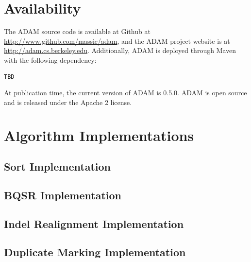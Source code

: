 \documentclass[10pt,twocolumn]{article}
\theoremstyle{plain}
\begin{document}
\appendix

\section{Availability}
\label{sec:availability}

The ADAM source code is available at Github at \url{http://www.github.com/massie/adam}, and the ADAM project website
is at \url{http://adam.cs.berkeley.edu}. Additionally, ADAM is deployed through Maven with the following dependency:

\begin{verbatim}
TBD
\end{verbatim}

At publication time, the current version of ADAM is 0.5.0. ADAM is open source and is released under the Apache 2
license.

\section{Algorithm Implementations}
\label{sec:algorithm-implentations}

\subsection{Sort Implementation}
\label{sec:sort-implementation}

\subsection{BQSR Implementation}
\label{sec:bqsr-implementation}

\subsection{Indel Realignment Implementation}
\label{sec:indel-realignment-implementation}

\subsection{Duplicate Marking Implementation}
\label{sec:duplicate-marking-implementation}





\clearpage
\end{document}
